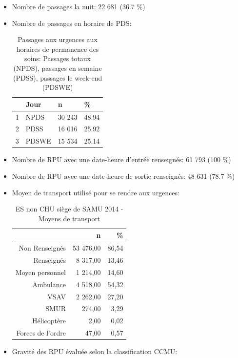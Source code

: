 \documentclass[]{article}
\begin{document}
\begin{itemize}
\item
  Nombre de passages la nuit: 22 681 (36.7 \%)
\item
  Nombre de passages en horaire de PDS:

  \begin{table}[ht]
  \centering
  \begin{tabular}{rlll}
    \hline
   & Jour & n & \% \\ 
    \hline
  1 & NPDS & 30 243 & 48.94 \\ 
    2 & PDSS & 16 016 & 25.92 \\ 
    3 & PDSWE & 15 534 & 25.14 \\ 
     \hline
  \end{tabular}
  \caption{Passages aux urgences aux horaires de permanence des soins: Passages totaux (NPDS), passages  en semaine (PDSS), passages le week-end (PDSWE)} 
  \end{table}
\item
  Nombre de RPU avec une date-heure d'entrée renseignés: 61 793 (100 \%)
\item
  Nombre de RPU avec une date-heure de sortie renseignés: 48 631 (78.7
  \%)
\item
  Moyen de transport utilisé pour se rendre aux urgences:

  \begin{table}[ht]
  \centering
  \begin{tabular}{rrr}
    \hline
   & n & \% \\ 
    \hline
  Non Renseignés & 53 476,00 & 86,54 \\ 
    Renseignés & 8 317,00 & 13,46 \\ 
    Moyen personnel & 1 214,00 & 14,60 \\ 
    Ambulance & 4 518,00 & 54,32 \\ 
    VSAV & 2 262,00 & 27,20 \\ 
    SMUR & 274,00 & 3,29 \\ 
    Hélicoptère & 2,00 & 0,02 \\ 
    Forces de l'ordre & 47,00 & 0,57 \\ 
     \hline
  \end{tabular}
  \caption{ES non CHU siège de SAMU 2014 - Moyens de transport} 
  \end{table}
\item
  Gravité des RPU évaluée selon la classification CCMU:


\end{itemize}
\end{document}

